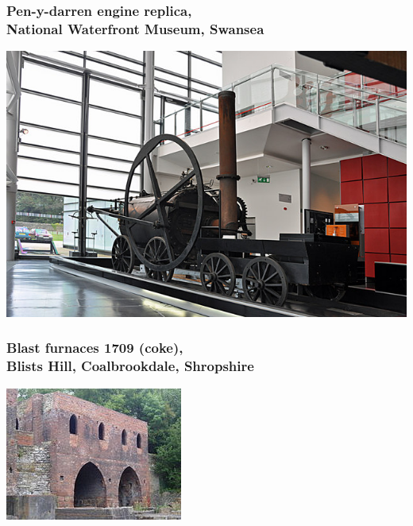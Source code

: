\documentclass[final]{beamer}
\begin{document}
\begin{frame}
\frametitle{Pen-y-darren engine replica,\\ National Waterfront Museum, Swansea}
\begin{center}
\includegraphics[width=.9\textwidth]{pen-y-darrenEngine.jpg}
\end{center}
\end{frame}

\begin{frame}
\frametitle{Blast furnaces 1709 (coke),\\ Blists Hill, Coalbrookdale, Shropshire}
\begin{center}
\includegraphics[height=.8\textheight]{blastFurnace.jpg}
\end{center}
\end{frame}
\end{document}
